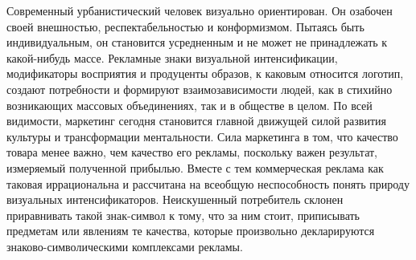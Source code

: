 Современный урбанистический человек визуально ориентирован. Он озабочен своей внешностью, респектабельностью и конформизмом.  Пытаясь быть индивидуальным, он становится усредненным и не может не принадлежать к какой-нибудь массе. Рекламные знаки визуальной интенсификации, модификаторы восприятия и продуценты образов, к каковым относится логотип,  создают потребности и формируют взаимозависимости людей, как в стихийно возникающих массовых объединениях, так и в обществе в целом.
По всей видимости, маркетинг сегодня становится главной движущей силой развития культуры и трансформации ментальности. Сила маркетинга в том, что качество товара менее важно, чем качество его рекламы, поскольку важен результат, измеряемый полученной прибылью. Вместе с тем коммерческая реклама как таковая иррациональна и рассчитана на всеобщую неспособность понять  природу визуальных интенсификаторов. Неискушенный потребитель склонен приравнивать такой знак-символ к тому, что за ним стоит, приписывать предметам или явлениям те качества, которые произвольно декларируются знаково-символическими комплексами рекламы.

